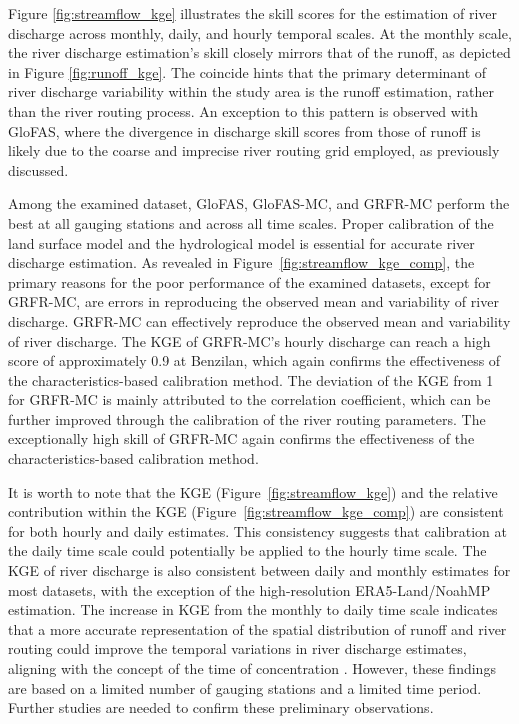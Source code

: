 \documentclass[water,article,submit,pdftex,moreauthors]{Definitions/mdpi}
\begin{document}
Figure \ref{fig:streamflow_kge} illustrates the skill scores for the estimation of river discharge across monthly, daily, and hourly temporal scales. At the monthly scale, the river discharge estimation's skill closely mirrors that of the runoff, as depicted in Figure \ref{fig:runoff_kge}. The coincide hints that the primary determinant of river discharge variability within the study area is the runoff estimation, rather than the river routing process. An exception to this pattern is observed with GloFAS, where the divergence in discharge skill scores from those of runoff is likely due to the coarse and imprecise river routing grid employed, as previously discussed.

Among the examined dataset, GloFAS, GloFAS-MC, and GRFR-MC perform the best at all gauging stations and across all time scales. Proper calibration of the land surface model and the hydrological model is essential for accurate river discharge estimation. As revealed in Figure~\ref{fig:streamflow_kge_comp}, the primary reasons for the poor performance of the examined datasets, except for GRFR-MC, are errors in reproducing the observed mean and variability of river discharge. GRFR-MC can effectively reproduce the observed mean and variability of river discharge. The KGE of GRFR-MC's hourly discharge can reach a high score of approximately 0.9 at Benzilan, which again confirms the effectiveness of the characteristics-based calibration method. The deviation of the KGE from 1 for GRFR-MC is mainly attributed to the correlation coefficient, which can be further improved through the calibration of the river routing parameters. The exceptionally high skill of GRFR-MC again confirms the effectiveness of the characteristics-based calibration method.

It is worth to note that the KGE (Figure~\ref{fig:streamflow_kge}) and the relative contribution within the KGE (Figure~\ref{fig:streamflow_kge_comp}) are consistent for both hourly and daily estimates. This consistency suggests that calibration at the daily time scale could potentially be applied to the hourly time scale. The KGE of river discharge is also consistent between daily and monthly estimates for most datasets, with the exception of the high-resolution ERA5-Land/NoahMP estimation. The increase in KGE from the monthly to daily time scale indicates that a more accurate representation of the spatial distribution of runoff and river routing could improve the temporal variations in river discharge estimates, aligning with the concept of the time of concentration \citep{beven2020HESS}. However, these findings are based on a limited number of gauging stations and a limited time period. Further studies are needed to confirm these preliminary observations.
\end{document}
